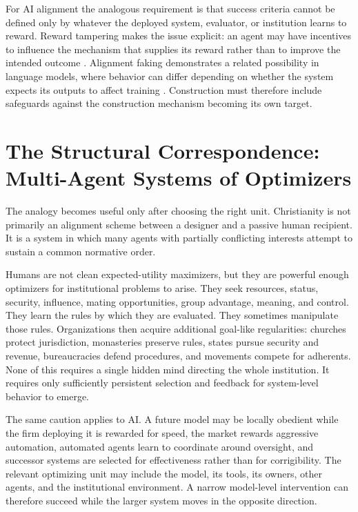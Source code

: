 \documentclass[11pt]{article}
\begin{document}
For AI alignment the analogous requirement is that success criteria cannot be defined only by whatever the deployed system, evaluator, or institution learns to reward. Reward tampering makes the issue explicit: an agent may have incentives to influence the mechanism that supplies its reward rather than to improve the intended outcome \parencite{everitt2019rewardtampering}. Alignment faking demonstrates a related possibility in language models, where behavior can differ depending on whether the system expects its outputs to affect training \parencite{greenblatt2024alignmentfaking}. Construction must therefore include safeguards against the construction mechanism becoming its own target.

\section{The Structural Correspondence: Multi-Agent Systems of Optimizers}

The analogy becomes useful only after choosing the right unit. Christianity is not primarily an alignment scheme between a designer and a passive human recipient. It is a system in which many agents with partially conflicting interests attempt to sustain a common normative order.

Humans are not clean expected-utility maximizers, but they are powerful enough optimizers for institutional problems to arise. They seek resources, status, security, influence, mating opportunities, group advantage, meaning, and control. They learn the rules by which they are evaluated. They sometimes manipulate those rules. Organizations then acquire additional goal-like regularities: churches protect jurisdiction, monasteries preserve rules, states pursue security and revenue, bureaucracies defend procedures, and movements compete for adherents. None of this requires a single hidden mind directing the whole institution. It requires only sufficiently persistent selection and feedback for system-level behavior to emerge.

The same caution applies to AI. A future model may be locally obedient while the firm deploying it is rewarded for speed, the market rewards aggressive automation, automated agents learn to coordinate around oversight, and successor systems are selected for effectiveness rather than for corrigibility. The relevant optimizing unit may include the model, its tools, its owners, other agents, and the institutional environment. A narrow model-level intervention can therefore succeed while the larger system moves in the opposite direction.
\end{document}
